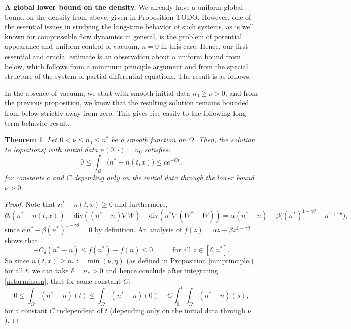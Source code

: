 \documentclass[12pt]{article}
\theoremstyle{plain}
\newtheorem{theorem}{Theorem}[section]
\begin{document}
\medskip

\noindent \textbf{A global lower bound on the density.} We already have a uniform global bound on the density from above, given in Proposition TODO. However, one of the essential issues in studying the long-time behavior of such systems, as is well known for compressible flow dynamics in general, is the problem of potential appearance and uniform control of vacuum, $n = 0$ in this case. Hence, our first essential and crucial estimate is an observation about a uniform bound from below, which follows from a minimum principle argument and from the special structure of the system of partial differential equations. The result is as follows.

\medskip

In the absence of vacuum, we start with smooth initial data $n_{0} \ge \nu > 0$, and from the previous proposition, we know that the resulting solution remains bounded from below strictly away from zero. This gives rise easily to the following long-term behavior result.

\fi

\begin{theorem}
    Let $0 < \nu \le n_{0} \le n^{*}$ be a smooth function on $\overline{\Omega}$. Then, the solution to \eqref{equations} with initial data $n(0, \cdot) = n_{0}$ satisfies:
    \begin{equation*}
        0 \le \int_{\Omega} \Big(n^{*} - n(t, x)\Big) \le ce^{-Ct},
    \end{equation*}
    for constants $c$ and $C$ depending only on the initial data through the lower bound $\nu > 0$.
\end{theorem}

\begin{proof}
Note that $n^{*} - n(t, x) \ge 0$ and furthermore, 
\begin{equation}\label{nstarminusn}
\partial_{t}(n^{*} - n(t, x)) - \text{div}((n^{*} - n)\nabla W) - \text{div}(n^{*}\nabla(W^{*} - W)) = \alpha (n^{*} - n) - \beta \Big((n^{*})^{1 + \gamma \theta} - n^{1 + \gamma \theta}\Big),
\end{equation}
since $\alpha n^{*} - \beta (n^{*})^{1 + \gamma \theta} = 0$ by definition. An analysis of $f(z) = \alpha z - \beta z^{1 + \gamma \theta}$ shows that
\begin{equation*}
-C_{\delta} (n^{*} - n) \le f(n^{*}) - f(n) \le 0, \qquad \text{ for all } z \in [\delta, n^{*}].
\end{equation*}
So since $n(t, x) \ge n_{*} := \min(\nu, \eta)$ (as defined in Proposition \ref{minprinciple}) for all $t$, we can take $\delta = n_{*} > 0$ and hence conclude after integrating \eqref{nstarminusn}, that for some constant $C$:
\begin{equation*}
0 \le \int_{\Omega} (n^{*} - n)(t) \le \int_{\Omega} (n^{*} - n)(0) - C\int_{0}^{t} \int_{\Omega} (n^{*} - n)(s),
\end{equation*}
for a constant $C$ independent of $t$ (depending only on the initial data through $\nu$).
\end{proof}
\end{document}
